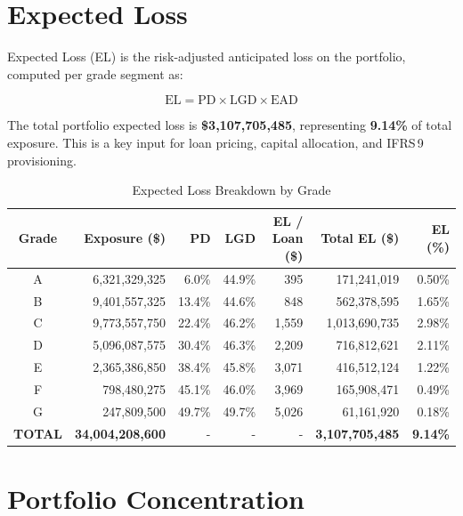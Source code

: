 \documentclass[11pt, a4paper]{article}
\begin{document}
\section{Expected Loss}
\label{sec:el}

Expected Loss (EL) is the risk-adjusted anticipated loss on the portfolio, computed per
grade segment as:

\begin{equation}
    \text{EL} = \text{PD} \times \text{LGD} \times \text{EAD}
\end{equation}

The total portfolio expected loss is \textbf{\$3,107,705,485}, representing
\textbf{9.14\%} of total exposure.  This is a key input for loan
pricing, capital allocation, and IFRS\,9 provisioning.

\begin{table}[H]
\centering
\caption{Expected Loss Breakdown by Grade}
\begin{tabular}{c r r r r r r}
\toprule
\textbf{Grade} & \textbf{Exposure (\$)} & \textbf{PD} & \textbf{LGD} & \textbf{EL / Loan (\$)} & \textbf{Total EL (\$)} & \textbf{EL (\%)} \\
\midrule
A & 6,321,329,325 & 6.0\% & 44.9\% & 395 & 171,241,019 & 0.50\% \\
B & 9,401,557,325 & 13.4\% & 44.6\% & 848 & 562,378,595 & 1.65\% \\
C & 9,773,557,750 & 22.4\% & 46.2\% & 1,559 & 1,013,690,735 & 2.98\% \\
D & 5,096,087,575 & 30.4\% & 46.3\% & 2,209 & 716,812,621 & 2.11\% \\
E & 2,365,386,850 & 38.4\% & 45.8\% & 3,071 & 416,512,124 & 1.22\% \\
F & 798,480,275 & 45.1\% & 46.0\% & 3,969 & 165,908,471 & 0.49\% \\
G & 247,809,500 & 49.7\% & 49.7\% & 5,026 & 61,161,920 & 0.18\% \\
\textbf{TOTAL} & \textbf{34,004,208,600} & - & - & - & \textbf{3,107,705,485} & \textbf{9.14\%} \\
\bottomrule
\end{tabular}
\label{tab:el}
\end{table}

\section{Portfolio Concentration}
\label{sec:concentration}
\end{document}
